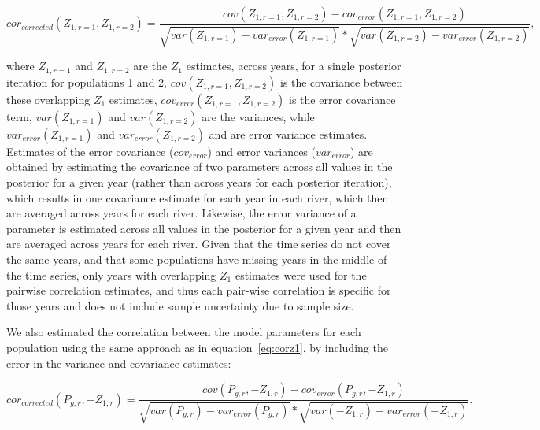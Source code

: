 \documentclass[12pt]{article}
\begin{document}
\begin{equation}
cor_{corrected}(Z_{1,r=1},Z_{1,r=2}) = \frac{cov(Z_{1,r=1}, Z_{1,r=2}) - cov_{error}(Z_{1,r=1}, Z_{1,r=2})}
    {\sqrt{var(Z_{1,r=1}) - var_{error}(Z_{1,r=1})}*\sqrt{var(Z_{1,r=2}) - var_{error}(Z_{1,r=2})}}, \label{eq:corz1}
\end{equation}


where $Z_{1,r=1}$ and $Z_{1,r=2}$ are the $Z_1$ estimates, across years, for a
single posterior iteration for populations 1 and 2,
$cov(Z_{1,r=1}, Z_{1,r=2})$ is the covariance between these overlapping $Z_1$ estimates,
$cov_{error}(Z_{1,r=1}, Z_{1,r=2})$ is the error covariance term,
$var(Z_{1,r=1})$ and $var(Z_{1,r=2})$ are the variances, while
$var_{error}(Z_{1,r=1})$ and $var_{error}(Z_{1,r=2})$ and are error variance estimates.
Estimates of the error covariance ($cov_{error}$) and error
variances ($var_{error}$) are obtained by estimating the covariance of
two parameters across all values in the posterior for a given year (rather
than across years for each posterior iteration), which results in one
covariance estimate for each year in each river, which then are averaged
across years for each river. Likewise, the error variance of a parameter is estimated
across all values in the posterior for a given year and then are averaged
across years for each river.
Given that the time series do not cover the same years, and that some populations
have missing years in the middle of the time series, only years with overlapping
$Z_1$ estimates were used for the pairwise correlation estimates, and thus
each pair-wise correlation is specific for those years and does not include sample uncertainty due to sample size.

We also estimated the correlation between the model parameters for each population using
the same approach as in equation~\ref{eq:corz1},
by including the error in the variance and covariance estimates:

\begin{equation}
cor_{corrected}(P_{g,r},-Z_{1,r}) = \frac{cov(P_{g,r}, -Z_{1,r}) - cov_{error}(P_{g,r}, -Z_{1,r})}
{\sqrt{var(P_{g,r})- var_{error}(P_{g,r})}*\sqrt{var(-Z_{1,r}) - var_{error}(-Z_{1,r})}}\label{eq:corparam}.
\end{equation}
\end{document}
